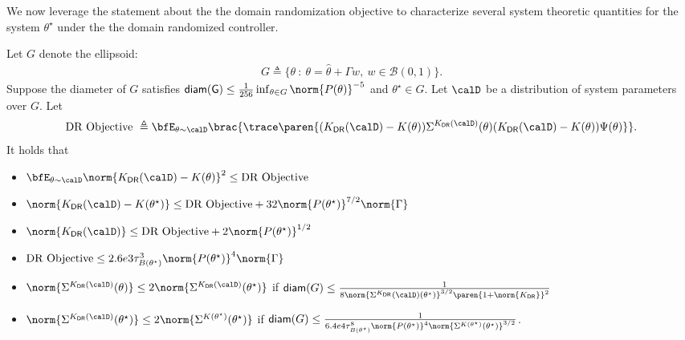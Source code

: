 We now leverage the statement about the the domain randomization objective to characterize several system theoretic quantities for the system $\theta^\star$ under the the domain randomized controller. 
\begin{lemma}
    \label{lem: DR helper lemmas}
    Let $G$ denote the ellipsoid:
    \begin{align*}
        G \triangleq \{\theta ~:~ \theta=\hat \theta + \Gamma w, ~ w\in\mathcal{B}(0, 1)\}.
    \end{align*} 
    Suppose the diameter of $G$ satisfies $\mathsf{diam(G)}\leq\frac{1}{256}\inf_{\theta\in G}\norm{P(\theta)}^{-5}$ and $\theta^\star\in G$. 
    Let $\calD$ be a distribution of system parameters over $G$. Let 
    \begin{align*}
        \textnormal{DR Objective } \triangleq  \bfE_{\theta\sim\calD} \brac{\trace\paren{(K_{\mathsf{DR}}(\calD) - K(\theta)) \Sigma^{K_{\mathsf{DR}}(\calD)}(\theta)  (K_{\mathsf{DR}}(\calD) - K(\theta)) \Psi(\theta)}}.
    \end{align*}
    It holds that 
    \begin{itemize}
        \item $\bfE_{\theta\sim\calD} \norm{K_{\mathsf{DR}}(\calD)- K(\theta)}^2 \leq \textnormal{DR Objective}$
        \item $\norm{K_{\mathsf{DR}}(\calD) - K(\theta^\star)} \leq \textnormal{DR Objective} + 32 \norm{P(\theta^\star)}^{7/2} \norm{\Gamma}$
        \item $\norm{K_{\mathsf{DR}}(\calD)}\leq \textnormal{DR Objective} + 2\norm{P(\theta^\star)}^{1/2}$ 
        \item $\textnormal{DR Objective} \leq 2.6e3\tau^3_{B(\theta^\star)}\norm{P(\theta^\star)}^4 \norm{\Gamma}$
        \item $\norm{\Sigma^{K_{\mathsf{DR}}(\calD)}(\theta)}\leq2\norm{\Sigma^{K_{\mathsf{DR}}(\calD)}(\theta^\star)}$ if $\mathsf{diam}(G)\leq\frac{1}{8\norm{\Sigma^{K_{\mathsf{DR}}}(\calD)(\theta^\star)}^{3/2}\paren{1+\norm{K_{\mathsf{DR}}}}^2}$
        \item $\norm{\Sigma^{K_{\mathsf{DR}}(\calD)}(\theta^\star)} 
        \leq 2\norm{\Sigma^{K(\theta^\star)}(\theta^\star)}$ if $\mathsf{diam}(G)\leq\frac{1}{6.4e4\tau^8_{B(\theta^\star)}\norm{P(\theta^\star)}^4\norm{\Sigma^{K(\theta^\star)}(\theta^\star)}^{3/2}}$. 
    \end{itemize}
\end{lemma}
